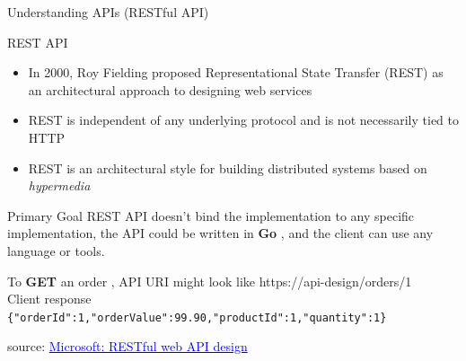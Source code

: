 \documentclass{beamer}
\newcommand{\code}[1]{\colorbox{codegray}{\texttt{#1}}}
\begin{document}
\begin{frame}[t]{Understanding APIs \small (RESTful API)}
  
    \scriptsize 
  \begin{block}{REST API}  
   \begin{itemize}
    \scriptsize 
   	\item In 2000, Roy Fielding proposed Representational State Transfer (REST) as an architectural approach to designing web services
   	\item REST is independent of any underlying protocol and is not necessarily tied to HTTP
   	\item REST is an architectural style for building distributed systems based on \textit{hypermedia}
   \end{itemize}	   
  \end{block}  
  
    \scriptsize  
  \begin{block}{Primary Goal}  
  \scriptsize
	 {REST API doesn't bind the implementation to any specific implementation, the API could be written in \textbf{Go} , and the client can use any language or tools.}	   
  \end{block}  
  
  \scriptsize
  \begin{example}
  	  	\scriptsize To \textbf{GET} an order , API URI might look like https://api-design/orders/1 \\
  		\scriptsize Client response \code {\{"orderId":1,"orderValue":99.90,"productId":1,"quantity":1\}}
  \end{example}
  
  \tiny { source: \href{https://learn.microsoft.com/en-us/azure/architecture/best-practices/api-design}
  		{\textcolor{blue}{Microsoft: RESTful web API design}}}
  
\end{frame}
\end{document}
